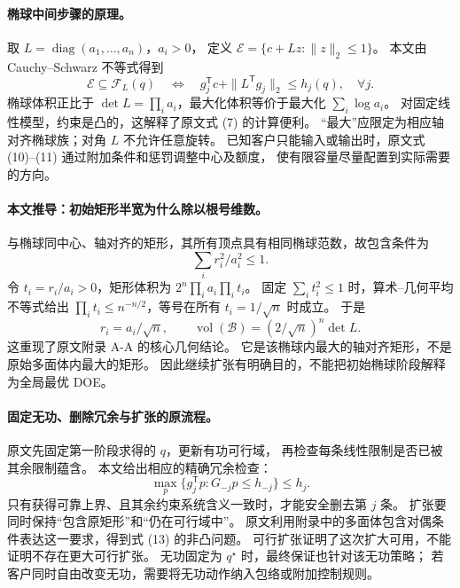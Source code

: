 \documentclass[UTF8,11pt,fontset=fandol]{ctexart}
\theoremstyle{remark}
\numberwithin{equation}{section}
\begin{document}
\paragraph{椭球中间步骤的原理。}
取 $L=\operatorname{diag}(a_1,\ldots,a_n)$，$a_i>0$，
定义 $\mathcal E=\{c+Lz:\|z\|_2\leq1\}$。
本文由 Cauchy--Schwarz 不等式得到
\begin{equation}
 \mathcal E\subseteq\mathcal F_L(q)
 \quad\Longleftrightarrow\quad
 g_j^{\mathsf T}c+\|L^{\mathsf T}g_j\|_2\leq h_j(q),\quad\forall j.
 \label{eq:eng-s11-ellipsoid-cert}
\end{equation}
椭球体积正比于 $\det L=\prod_i a_i$，最大化体积等价于最大化 $\sum_i\log a_i$。
对固定线性模型，约束是凸的，这解释了原文式 (7) 的计算便利。
“最大”应限定为相应轴对齐椭球族；对角 $L$ 不允许任意旋转。
已知客户只能输入或输出时，原文式 (10)--(11) 通过附加条件和惩罚调整中心及额度，
使有限容量尽量配置到实际需要的方向。

\paragraph{本文推导：初始矩形半宽为什么除以根号维数。}
与椭球同中心、轴对齐的矩形，其所有顶点具有相同椭球范数，故包含条件为
\begin{equation}
 \sum_i r_i^2/a_i^2\leq1.
 \label{eq:eng-s11-innerbox}
\end{equation}
令 $t_i=r_i/a_i>0$，矩形体积为 $2^n\prod_i a_i\prod_i t_i$。
固定 $\sum_i t_i^2\leq1$ 时，算术--几何平均不等式给出
$\prod_i t_i\leq n^{-n/2}$，等号在所有 $t_i=1/\sqrt n$ 时成立。
于是
\begin{equation}
 r_i=a_i/\sqrt n,\qquad
 \operatorname{vol}(\mathcal B)=
 (2/\sqrt n)^n\det L.
 \label{eq:eng-s11-radius}
\end{equation}
这重现了原文附录 A-A 的核心几何结论。
它是该椭球内最大的轴对齐矩形，不是原始多面体内最大的矩形。
因此继续扩张有明确目的，不能把初始椭球阶段解释为全局最优 DOE。

\paragraph{固定无功、删除冗余与扩张的原流程。}
原文先固定第一阶段求得的 $q$，更新有功可行域，
再检查每条线性限制是否已被其余限制蕴含。
本文给出相应的精确冗余检查：
\begin{equation}
 \max_p\{g_j^{\mathsf T}p:G_{-j}p\leq h_{-j}\}\leq h_j.
 \label{eq:eng-s11-redundancy}
\end{equation}
只有获得可靠上界、且其余约束系统含义一致时，才能安全删去第 $j$ 条。
扩张要同时保持“包含原矩形”和“仍在可行域中”。
原文利用附录中的多面体包含对偶条件表达这一要求，得到式 (13) 的非凸问题。
可行扩张证明了这次扩大可用，不能证明不存在更大可行扩张。
无功固定为 $q^\star$ 时，最终保证也针对该无功策略；
若客户同时自由改变无功，需要将无功动作纳入包络或附加控制规则。
\end{document}
